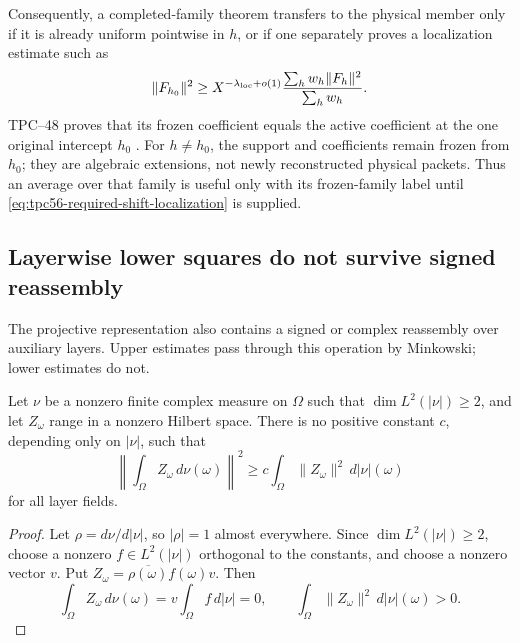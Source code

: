 Consequently, a completed-family theorem transfers to the physical member
only if it is already uniform pointwise in \(h\), or if one separately
proves a localization estimate such as
\begin{equation}
 \|F_{h_0}\|^2
 \ge X^{-\lambda_{\rm loc}+o(1)}
 \frac{\sum_hw_h\|F_h\|^2}{\sum_hw_h}.
 \label{eq:tpc56-required-shift-localization}
\end{equation}
TPC--48 proves that its frozen coefficient equals the active coefficient
at the one original intercept \(h_0\) \citep{WangTPC48}.  For
\(h\ne h_0\), the support and coefficients remain frozen from \(h_0\);
they are algebraic extensions, not newly reconstructed physical packets.
Thus an average over that family is useful only with its frozen-family
label until \eqref{eq:tpc56-required-shift-localization} is supplied.

\subsection{Layerwise lower squares do not survive signed reassembly}

The projective representation also contains a signed or complex
reassembly over auxiliary layers.  Upper estimates pass through this
operation by Minkowski; lower estimates do not.

\begin{proposition}
\label{prop:tpc56-lower-reassembly-obstruction}
Let \(\nu\) be a nonzero finite complex measure on \(\Omega\) such that
\(\dim L^2(|\nu|)\ge2\), and let \(Z_\omega\) range in a nonzero Hilbert
space.  There is no positive constant \(c\), depending only on \(|\nu|\),
such that
\begin{equation}
 \left\|\int_\Omega Z_\omega\,d\nu(\omega)\right\|^2
 \ge c\int_\Omega\|Z_\omega\|^2\,d|\nu|(\omega)
 \label{eq:tpc56-false-lower-reassembly}
\end{equation}
for all layer fields.
\end{proposition}

\begin{proof}
Let \(\rho=d\nu/d|\nu|\), so \(|\rho|=1\) almost everywhere.  Since
\(\dim L^2(|\nu|)\ge2\), choose a nonzero
\(f\in L^2(|\nu|)\) orthogonal to the constants, and choose a nonzero vector
\(v\).  Put
\(Z_\omega=\overline{\rho(\omega)}f(\omega)v\).  Then
\[
 \int_\Omega Z_\omega\,d\nu(\omega)
 =v\int_\Omega f\,d|\nu|=0,
 \qquad
 \int_\Omega\|Z_\omega\|^2\,d|\nu|(\omega)>0.
\]
\end{proof}

